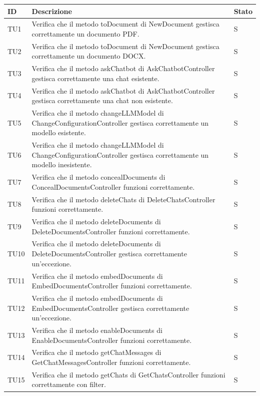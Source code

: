 \documentclass[10pt, a4paper]{article}
\begin{document}
\renewcommand{\arraystretch}{1.5}
\begin{xltabular}{\textwidth}{p{0.12\textwidth}|p{0.7\textwidth}|X}
\textbf{ID} & \textbf{Descrizione} & \textbf{Stato}  \\
\hline
TU1 & Verifica che il metodo toDocument di NewDocument gestisca correttamente un documento PDF. & S \\
\hline
TU2 & Verifica che il metodo toDocument di NewDocument gestisca correttamente un documento DOCX. & S \\
\hline
TU3 & Verifica che il metodo askChatbot di AskChatbotController gestisca correttamente una chat esistente. & S \\
\hline
TU4 & Verifica che il metodo askChatbot di AskChatbotController gestisca correttamente una chat non esistente. & S \\
\hline
TU5 & Verifica che il metodo changeLLMModel di ChangeConfigurationController gestisca correttamente un modello esistente. & S \\
\hline
TU6 & Verifica che il metodo changeLLMModel di ChangeConfigurationController gestisca correttamente un modello inesistente. & S \\
\hline
TU7 & Verifica che il metodo concealDocuments di ConcealDocumentsController funzioni correttamente. & S \\
\hline
TU8 & Verifica che il metodo deleteChats di DeleteChatsController funzioni correttamente. & S \\
\hline
TU9 & Verifica che il metodo deleteDocuments di DeleteDocumentsController funzioni correttamente. & S \\
\hline
TU10 & Verifica che il metodo deleteDocuments di DeleteDocumentsController gestisca correttamente un'eccezione. & S \\
\hline
TU11 & Verifica che il metodo embedDocuments di EmbedDocumentsController funzioni correttamente. & S \\
\hline
TU12 & Verifica che il metodo embedDocuments di EmbedDocumentsController gestisca correttamente un'eccezione. & S \\
\hline
TU13 & Verifica che il metodo enableDocuments di EnableDocumentsController funzioni correttamente. & S \\
\hline
TU14 & Verifica che il metodo getChatMessages di GetChatMessagesController funzioni correttamente. & S \\
\hline
TU15 & Verifica che il metodo getChats di GetChatsController funzioni correttamente con filter. & S \\

\end{xltabular}
\end{document}
